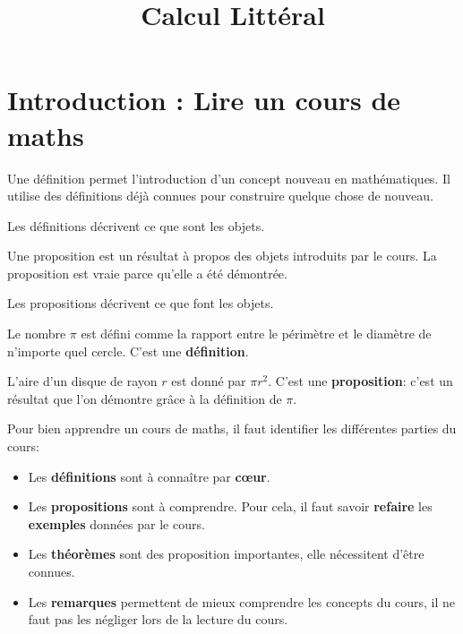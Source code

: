 \documentclass{article}
\author{}
\date{}
\title{Calcul Littéral}
\begin{document}
\maketitle
\section{Introduction : Lire un cours de maths}
\begin{tcolorbox}
\begin{definition}
Une définition permet l'introduction d'un concept nouveau en mathématiques. Il utilise des définitions déjà connues pour construire quelque chose de nouveau.
\end{definition}
\end{tcolorbox}
Les définitions décrivent ce que sont les objets.
\begin{proposition}
Une proposition est un résultat à propos des objets introduits par le cours. La proposition est vraie parce qu'elle a été démontrée.
\end{proposition}
Les propositions décrivent ce que font les objets.
\begin{example}
Le nombre $\pi$ est défini comme la rapport entre le périmètre et le diamètre de n'importe quel cercle. C'est une \textbf{définition}.

L'aire d'un disque de rayon $r$ est donné par $\pi r^2$. C'est une \textbf{proposition}: c'est un résultat que l'on démontre grâce à la définition de $\pi$.
\end{example}
\begin{remark}
Pour bien apprendre un cours de maths, il faut identifier les différentes parties du cours: 
\begin{itemize}
\item Les \textbf{définitions} sont à connaître par \textbf{cœur}.
\item Les \textbf{propositions} sont à comprendre. Pour cela, il faut savoir \textbf{refaire} les \textbf{exemples} données par le cours.
\item Les \textbf{théorèmes} sont des proposition importantes, elle nécessitent d'être connues.
\item Les \textbf{remarques} permettent de mieux comprendre les concepts du cours, il ne faut pas les négliger lors de la lecture du cours.
\end{itemize}
\end{remark}
\newpage
\end{document}
